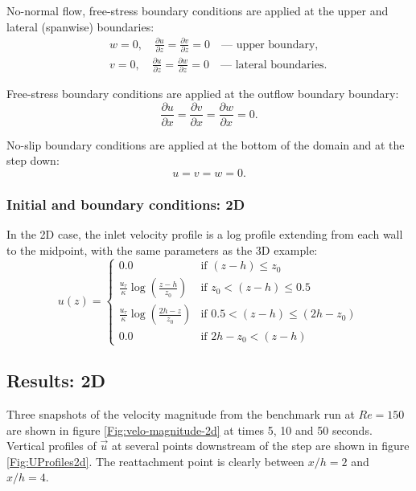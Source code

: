 No-normal flow, free-stress boundary conditions are applied at the upper and lateral
(spanwise) boundaries:
\begin{eqnarray*}
&&w=0,\quad \frac{\partial u}{\partial z} = \frac{\partial v}{\partial z} = 0 \quad\textrm{--- upper boundary},\\
&&v=0,\quad \frac{\partial u}{\partial z} = \frac{\partial w}{\partial z} = 0 \quad\textrm{--- lateral boundaries}.
\end{eqnarray*}

Free-stress boundary conditions are applied at the outflow boundary boundary:
\begin{equation*}
\frac{\partial u}{\partial x} = \frac{\partial v}{\partial x} = \frac{\partial w}{\partial x} = 0.
\end{equation*}

No-slip boundary conditions are applied at the bottom of the domain and at the step down:
\begin{equation*}
u=v=w=0.
\end{equation*}

\subsubsection{Initial and boundary conditions: 2D}
In the 2D case, the inlet velocity profile is a log profile extending from each wall to the midpoint, with the same parameters as the 3D example:
\begin{equation*}
u(z) =
  \begin{cases}
    0.0 & \text{if } (z-h) \leq z_0 \\
    \frac{u_{\tau}}{\kappa} \log \left(\frac{z - h}{z_0}\right) & \text{if } z_0 < (z-h) \leq 0.5 \\
    \frac{u_{\tau}}{\kappa} \log \left(\frac{2h - z}{z_0}\right) & \text{if } 0.5 < (z-h) \leq (2h-z_0) \\
    0.0 & \text{if } 2h-z_0 < (z-h)
  \end{cases}
\end{equation*}


\subsection{Results: 2D}
Three snapshots of the velocity magnitude from the benchmark run at $Re=150$
are shown in figure \ref{Fig:velo-magnitude-2d} at times 5, 10 and 50 seconds.
Vertical profiles of $\vec{u}$ at several points downstream of the step are shown
in figure \ref{Fig:UProfiles2d}. The reattachment point is clearly between $x/h=2$ and $x/h=4$.

